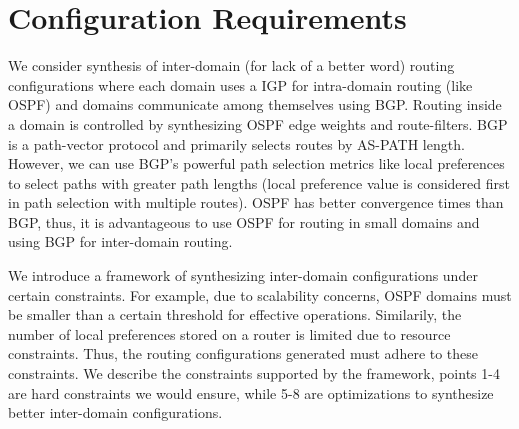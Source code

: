 \section{Configuration Requirements}
We consider synthesis of inter-domain 
(for lack of a better word) routing 
configurations where each domain uses a 
IGP for intra-domain routing (like 
OSPF) and domains communicate among 
themselves using BGP. 
Routing inside a domain is controlled 
by synthesizing OSPF edge weights and 
route-filters. BGP is a path-vector
protocol and primarily selects routes by 
AS-PATH length. However, we can 
use BGP's powerful path selection metrics 
like local preferences to select 
paths with greater path lengths (local
preference value is considered first in 
path selection with multiple routes). 
OSPF has better convergence times than BGP,
thus, it is advantageous to use OSPF for 
routing in small domains and using BGP for
inter-domain routing. 

We introduce a framework of synthesizing
inter-domain configurations under certain
constraints. For example, due to scalability
concerns, OSPF domains must be smaller than 
a certain threshold for effective operations.
Similarily, the number of local preferences 
stored on a router is limited due to 
resource constraints. Thus, the routing 
configurations generated must adhere to 
these constraints. We describe the constraints
supported by the framework, points 1-4 are 
hard constraints we would ensure, while 5-8
are optimizations to synthesize better inter-domain
configurations. 

